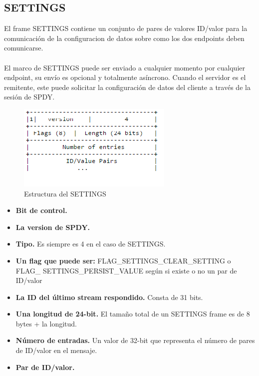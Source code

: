 \subsection{SETTINGS}
El frame SETTINGS contiene un conjunto de pares de valores ID/valor para la comunicación de la configuracion de datos sobre como los dos endpoints deben comunicarse.
\\
\\
El marco de SETTINGS puede ser enviado a cualquier momento por cualquier endpoint, su envío es opcional y totalmente asíncrono. Cuando el servidor es el remitente, este puede solicitar la configuración de datos del cliente a través de la sesión de SPDY.

\begin{figure}[H] %
\includegraphics[scale=1]{settings1.png}  %
\centering
\caption{Estructura del SETTINGS} \label{fig:figura7}
\end{figure}

\begin{itemize}
 \item \textbf{Bit de control.}
 \item \textbf{La version de SPDY.}
 \item \textbf{Tipo.} Es siempre es 4 en el caso de SETTINGS.
 \item \textbf{Un flag que puede ser:} FLAG\_SETTINGS\_CLEAR\_SETTING o FLAG\_ SETTINGS\_PERSIST\_VALUE  según si existe o no un par de ID/valor
 \item \textbf{La ID del último stream respondido.} Consta de 31 bits.
 \item \textbf{Una longitud de 24-bit.} El tamaño total de un SETTINGS frame es de 8 bytes + la longitud.
 \item \textbf{Número de entradas.} Un valor de 32-bit que representa el número de pares de ID/valor en el mensaje.
 \item \textbf{Par de ID/valor.}
\end{itemize}

